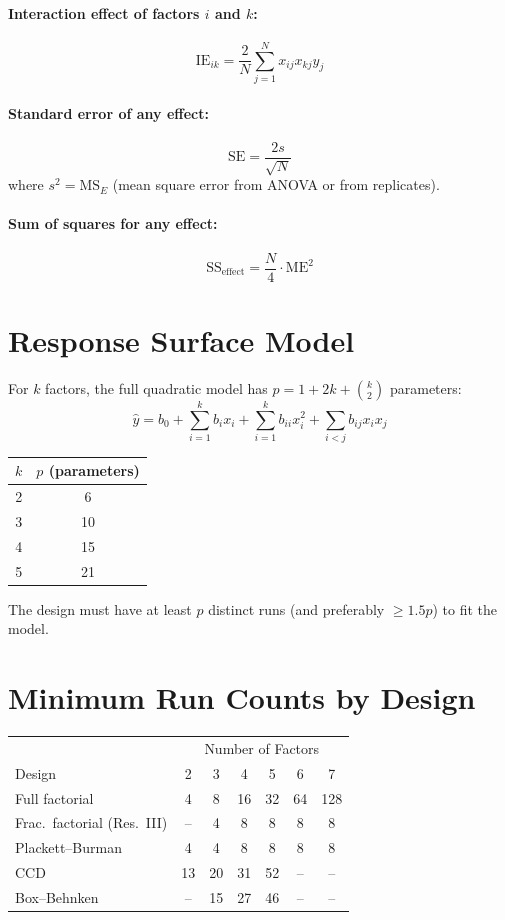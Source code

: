 \documentclass[11pt]{book}
\begin{document}
\paragraph{Interaction effect of factors $i$ and $k$:}
\[
\text{IE}_{ik} = \frac{2}{N} \sum_{j=1}^{N} x_{ij} x_{kj} y_j
\]

\paragraph{Standard error of any effect:}
\[
\text{SE} = \frac{2s}{\sqrt{N}}
\]
where $s^2 = \text{MS}_E$ (mean square error from ANOVA or from replicates).

\paragraph{Sum of squares for any effect:}
\[
\text{SS}_{\text{effect}} = \frac{N}{4} \cdot \text{ME}^2
\]

\section{Response Surface Model}

For $k$ factors, the full quadratic model has $p = 1 + 2k + \binom{k}{2}$
parameters:
\[
\hat{y} = b_0 + \sum_{i=1}^k b_i x_i
+ \sum_{i=1}^k b_{ii} x_i^2
+ \sum_{i<j} b_{ij} x_i x_j
\]

\begin{center}
\begin{tabular}{cc}
\toprule
$k$ & $p$ (parameters) \\
\midrule
2 & 6 \\
3 & 10 \\
4 & 15 \\
5 & 21 \\
\bottomrule
\end{tabular}
\end{center}

The design must have at least $p$ distinct runs (and preferably $\geq 1.5p$) to
fit the model.

\section{Minimum Run Counts by Design}

\begin{center}
\begin{tabular}{lcccccc}
\toprule
 & \multicolumn{6}{c}{Number of Factors} \\
Design & 2 & 3 & 4 & 5 & 6 & 7 \\
\midrule
Full factorial & 4 & 8 & 16 & 32 & 64 & 128 \\
Frac.\ factorial (Res.\ III) & -- & 4 & 8 & 8 & 8 & 8 \\
Plackett--Burman & 4 & 4 & 8 & 8 & 8 & 8 \\
CCD & 13 & 20 & 31 & 52 & -- & -- \\
Box--Behnken & -- & 15 & 27 & 46 & -- & -- \\
\bottomrule
\end{tabular}
\end{center}
\end{document}
